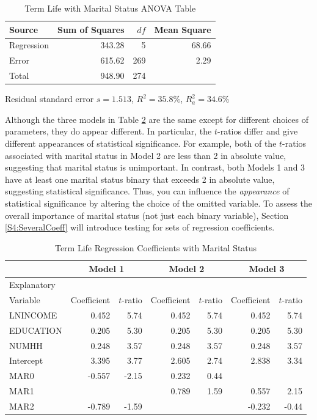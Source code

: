 \begin{table}
 \caption{\label{T4:MSTermLifeANOVA} Term Life with
Marital Status ANOVA Table}
\begin{tabular}{lrrr}
 \hline Source
& Sum of Squares & $df$ & Mean Square \\ \hline

Regression & 343.28 & 5 &   68.66 \\
Error      & 615.62 & 269 &  2.29 \\
Total      & 948.90& 274 &   \\ \hline
\end{tabular}

Residual standard error $s= 1.513$, $R^2 = 35.8\%$, $R_a^2 = 34.6\%$
\end{table}

Although the three models in Table \ref{T4:MSTermLifeRegrCoeff} are
the same except for different choices of parameters, they do appear
different. In particular, the $t$-ratios differ and give different
appearances of statistical significance. For example, both of the
$t$-ratios associated with marital status in Model 2 are less than 2
in absolute value, suggesting that marital status is unimportant. In
contrast, both Models 1 and 3 have at least one marital status
binary that exceeds 2 in absolute value, suggesting statistical
significance. Thus, you can influence the \emph{appearance} of
statistical significance by altering the choice of the omitted
variable. To assess the overall importance of marital status (not
just each binary variable), Section \ref{S4:SeveralCoeff} will
introduce testing for sets of regression coefficients.


\begin{table}
 \caption{\label{T4:MSTermLifeRegrCoeff} Term Life
Regression Coefficients with Marital Status}
\begin{tabular}{l|rr|rr|rr}
 \hline
 & \multicolumn{2}{c|}{Model 1}& \multicolumn{2}{c|}{Model 2}& \multicolumn{2}{c}{Model 3}\\
 \hline
 Explanatory \\
 Variable & Coefficient & $t$-ratio & Coefficient & $t$-ratio& Coefficient &
 $t$-ratio\\\hline
LNINCOME & 0.452 & 5.74 & 0.452 & 5.74 & 0.452 & 5.74 \\
EDUCATION &0.205 & 5.30 &0.205 & 5.30&0.205 & 5.30 \\
NUMHH     & 0.248 & 3.57 & 0.248 & 3.57 & 0.248 & 3.57 \\\hline
Intercept & 3.395 & 3.77  & 2.605&  2.74 & 2.838 & 3.34\\
MAR0    & -0.557 & -2.15&  0.232 &  0.44\\
MAR1 & & & 0.789 & 1.59 & 0.557 & 2.15\\
MAR2 & -0.789 & -1.59 & & & -0.232 & -0.44\\
\hline
\end{tabular}
\end{table}

